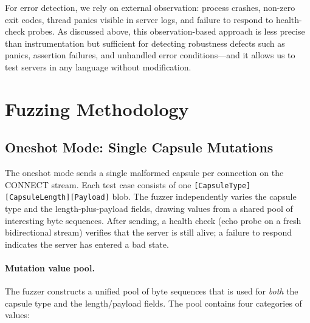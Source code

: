 For error detection, we rely on external observation: process crashes, non-zero exit codes, thread panics visible in server logs, and failure to respond to health-check probes. As discussed above, this observation-based approach is less precise than instrumentation but sufficient for detecting robustness defects such as panics, assertion failures, and unhandled error conditions---and it allows us to test servers in any language without modification.

\section{Fuzzing Methodology}

\subsection{Oneshot Mode: Single Capsule Mutations}

The oneshot mode sends a single malformed capsule per connection on the CONNECT stream. Each test case consists of one \texttt{[CapsuleType][CapsuleLength][Payload]} blob. The fuzzer independently varies the capsule type and the length-plus-payload fields, drawing values from a shared pool of interesting byte sequences. After sending, a health check (echo probe on a fresh bidirectional stream) verifies that the server is still alive; a failure to respond indicates the server has entered a bad state.

\paragraph{Mutation value pool.} The fuzzer constructs a unified pool of byte sequences that is used for \emph{both} the capsule type and the length/payload fields. The pool contains four categories of values:

